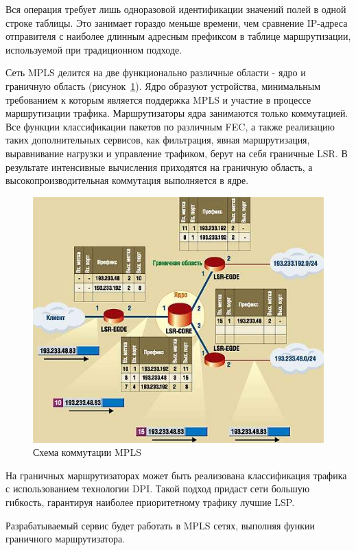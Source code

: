 Вся операция требует лишь одноразовой идентификации значений полей в одной строке таблицы. Это занимает гораздо меньше времени, чем сравнение IP-адреса отправителя с наиболее длинным адресным префиксом в таблице маршрутизации, используемой при традиционном подходе.

Сеть MPLS делится на две функционально различные области - ядро и граничную область (рисунок~\ref{pic:mpls_net_example}). Ядро образуют устройства, минимальным требованием к которым является поддержка MPLS и участие в процессе маршрутизации трафика. Маршрутизаторы ядра занимаются только коммутацией. Все функции классификации пакетов по различным FEC, а также реализацию таких дополнительных сервисов, как фильтрация, явная маршрутизация, выравнивание нагрузки и управление трафиком, берут на себя граничные LSR.  В результате интенсивные вычисления приходятся на граничную область, а высокопроизводительная коммутация выполняется в ядре.
\begin{figure}
\centering
\includegraphics[scale=0.55]{pictures/mpls_net_example}
\caption{Схема коммутации MPLS}
\label{pic:mpls_net_example}
\end{figure}

На граничных маршрутизаторах может быть реализована классификация трафика с использованием технологии DPI. Такой подход придаст сети большую гибкость, гарантируя наиболее приоритетному трафику лучшие LSP.

Разрабатываемый сервис будет работать в MPLS сетях, выполняя функии граничного маршрутизатора.

